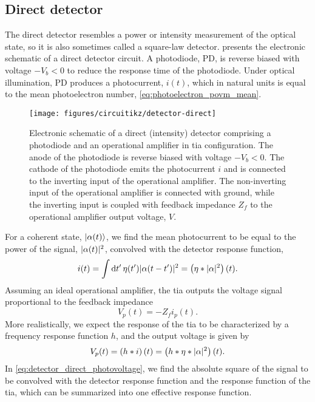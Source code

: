 \FloatBarrier
\subsection{Direct detector}

The direct detector resembles a power or intensity measurement of the optical state, so it is also sometimes called a square-law detector.
 presents the electronic schematic of a direct detector circuit.
A photodiode, PD, is reverse biased with voltage $-V_b<0$ to reduce the response time of the photodiode.
Under optical illumination, PD produces a photocurrent, $i(t)$, which in natural units is equal to the mean photoelectron number, \cref{eq:photoelectron_povm_mean}.
\begin{figure}[htb]
    \centering
    \texttt{[image: figures/circuitikz/detector-direct]}
    \caption{Electronic schematic of a direct (intensity) detector comprising a photodiode and an operational amplifier in \gls{tia} configuration. The anode of the photodiode is reverse biased with voltage $-V_b<0$. The cathode of the photodiode emits the photocurrent $i$ and is connected to the inverting input of the operational amplifier. The non-inverting input of the operational amplifier is connected with ground, while the inverting input is coupled with feedback impedance $Z_f$ to the operational amplifier output voltage, $V$.}\label{fig:detector_direct}
\end{figure}
For a coherent state, $\lvert\alpha(t)\rangle$, we find the mean photocurrent to be equal to the power of the signal, $\lvert\alpha(t)\rvert^2$, convolved with the detector response function,
\begin{equation}
	i(t)
	=
	\int\dd{t^\prime}
	\eta(t^\prime)
	\abs{\alpha(t-t^\prime)}^2
	=
	\left(\eta\conv\abs{\alpha}^2\right)(t)
	\label{eq:detector_direct_photocurrent}
	.
\end{equation}
Assuming an ideal operational amplifier, the \gls{tia} outputs the voltage signal proportional to the feedback impedance
\begin{equation}
	V_p(t)
	=
	-
	Z_f
	i_p(t)
	.
\end{equation}
More realistically, we expect the response of the \gls{tia} to be characterized by a frequency response function $h$, and the output voltage is given by
\begin{equation}
	V_p(t)
	=
	\left(h\ast i\right)(t)
	=
	\left(h\ast\eta\ast\lvert\alpha\rvert^2\right)(t)
	\label{eq:detector_direct_photovoltage}
	.
\end{equation}
In \cref{eq:detector_direct_photovoltage}, we find the absolute square of the signal to be convolved with the detector response function and the response function of the \gls{tia}, which can be summarized into one effective response function.

